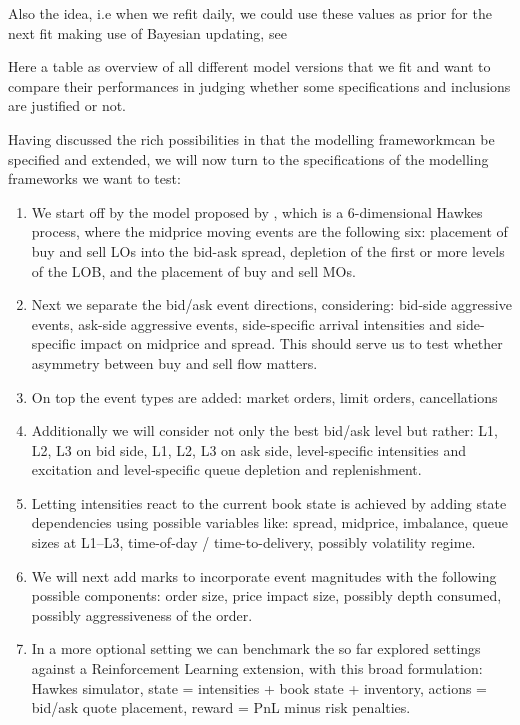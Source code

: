 \documentclass[12pt,a4paper]{cau_thesis}
\begin{document}
Also the idea, i.e when we refit daily, we could use these values as
prior for the next fit making use of Bayesian updating, see
\cite{jain2024limit}

Here a table as overview of all different model versions that we fit
and want to compare their performances in judging whether some
specifications and inclusions are justified or not.

Having discussed the rich possibilities in that the modelling
frameworkmcan be specified and extended, we will now turn to the
specifications of the modelling frameworks we want to test:
\begin{enumerate}
    \item We start off by the model proposed by \cite{luckner2021hawkes}, which
          is a 6-dimensional Hawkes process, where the midprice moving events
          are the following six: placement of buy and sell LOs into the bid-ask
          spread, depletion of the first or more levels of the LOB, and the
          placement of buy and sell MOs.
    \item Next we separate the bid/ask event directions, considering: bid-side
          aggressive events, ask-side aggressive events, side-specific arrival
          intensities and side-specific impact on midprice and spread. This
          should serve us to test whether asymmetry between buy and sell flow
          matters.
    \item On top the event types are added: market orders, limit orders,
          cancellations
    \item Additionally we will consider not only the best bid/ask level but
          rather: L1, L2, L3 on bid side, L1, L2, L3 on ask side,
          level-specific intensities and excitation and level-specific queue
          depletion and replenishment.
    \item Letting intensities react to the current book state is achieved by
          adding state dependencies using possible variables like: spread,
          midprice, imbalance, queue sizes at L1–L3, time-of-day /
          time-to-delivery, possibly volatility regime.
    \item We will next add marks to incorporate event magnitudes with the
          following possible components: order size, price impact size,
          possibly depth consumed, possibly aggressiveness of the order.
    \item In a more optional setting we can benchmark the so far explored
          settings against a Reinforcement Learning extension, with this broad
          formulation: Hawkes simulator, state = intensities + book state +
          inventory, actions = bid/ask quote placement, reward = PnL minus risk
          penalties.
\end{enumerate}
\end{document}
